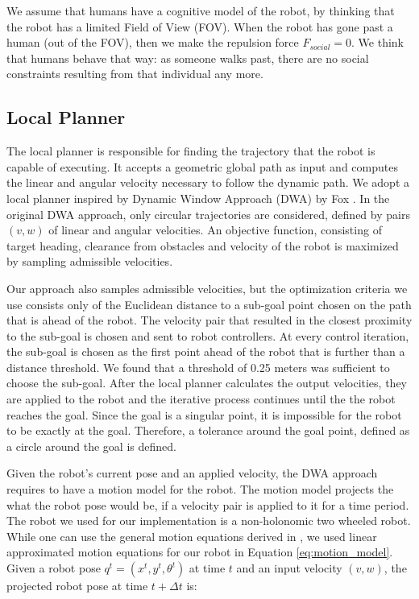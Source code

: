 We assume that humans have a cognitive model of the robot, by thinking that the robot has a limited Field of View (FOV). When the robot has gone past a human (out of the FOV), then we make the repulsion force $F_{social}=0$. We think that humans behave that way: as someone walks past, there are no social constraints resulting from that individual any more.

\subsection{Local Planner}
\label{sec:navigation_local_planner}

The local planner is responsible for finding the trajectory that the robot is capable of executing. It accepts a geometric global path as input and computes the linear and angular velocity necessary to follow the dynamic path. We adopt a local planner inspired by Dynamic Window Approach (DWA) by Fox \cite{fox1997dynamic}. In the original DWA approach, only circular trajectories are considered, defined by pairs $(v,w)$ of linear and angular velocities. An objective function, consisting of target heading, clearance from obstacles and velocity of the robot is maximized by sampling admissible velocities.

Our approach also samples admissible velocities, but the optimization criteria we use consists only of the Euclidean distance to a sub-goal point chosen on the path that is ahead of the robot. The velocity pair that resulted in the closest proximity to the sub-goal is chosen and sent to robot controllers. At every control iteration, the sub-goal is chosen as the first point ahead of the robot that is further than a distance threshold. We found that a threshold of 0.25 meters was sufficient to choose the sub-goal. After the local planner calculates the output velocities, they are applied to the robot and the iterative process continues until the the robot reaches the goal. Since the goal is a singular point, it is impossible for the robot to be exactly at the goal. Therefore, a tolerance around the goal point, defined as a circle around the goal is defined.

Given the robot's current pose and an applied velocity, the DWA approach requires to have a motion model for the robot. The motion model projects the what the robot pose would be, if a velocity pair is applied to it for a time period. The robot we used for our implementation is a non-holonomic two wheeled robot. While one can use the general motion equations derived in \cite{fox1997dynamic}, we used linear approximated motion equations for our robot in Equation \ref{eq:motion_model}. Given a robot pose $q^t=(x^t,y^t,\theta^t)$ at time $t$ and an input velocity $(v,w)$, the projected robot pose at time $t+\Delta t$ is:

